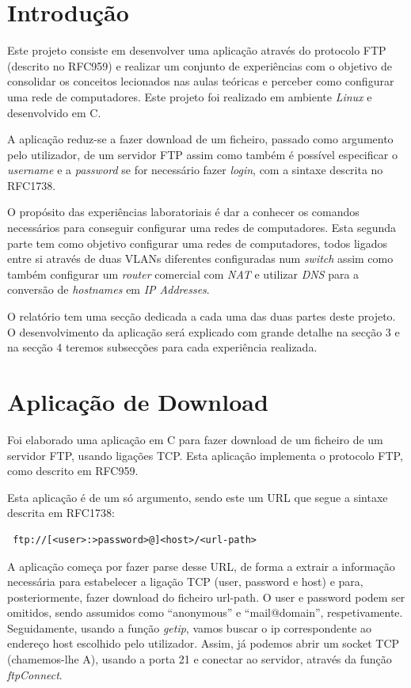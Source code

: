\documentclass[a4paper]{article}
\begin{document}
\section{Introdução}

Este projeto consiste em desenvolver uma aplicação através do protocolo FTP (descrito no RFC959) e realizar um conjunto de experiências com o objetivo de consolidar os conceitos lecionados nas aulas teóricas e perceber como configurar uma rede de computadores. Este projeto foi realizado em ambiente \textit{Linux} e desenvolvido em C.

A aplicação reduz-se a fazer download de um ficheiro, passado como argumento pelo utilizador, de um servidor FTP assim como também é possível especificar o \textit{username} e a \textit{password} se for necessário fazer \textit{login}, com a sintaxe descrita no RFC1738.

O propósito das experiências laboratoriais é dar a conhecer os comandos necessários para conseguir configurar uma redes de computadores. Esta segunda parte tem como objetivo configurar uma redes de computadores, todos ligados entre si através de duas VLANs diferentes configuradas num \textit{switch} assim como também configurar um \textit{router} comercial com \textit{NAT} e utilizar \textit{DNS} para a conversão de \textit{hostnames} em \textit{IP Addresses}.

O relatório tem uma secção dedicada a cada uma das duas partes deste projeto. O desenvolvimento da aplicação será explicado com grande detalhe na secção 3 e na secção 4 teremos subsecções para cada experiência realizada.

\section{Aplicação de Download}
Foi elaborado uma aplicação em C para fazer download de um ficheiro de um servidor FTP, usando ligações TCP. Esta aplicação implementa o protocolo FTP, como descrito em RFC959.

Esta aplicação é de um só argumento, sendo este um URL que segue a sintaxe descrita em RFC1738: \begin{verbatim} ftp://[<user>:>password>@]<host>/<url-path> \end{verbatim}
A aplicação começa por fazer parse desse URL, de forma a extrair a informação necessária para estabelecer a ligação TCP (user, password e host) e para, posteriormente, fazer download do ficheiro url-path. O user e password podem ser omitidos, sendo assumidos como “anonymous” e “mail@domain”, respetivamente.
Seguidamente, usando a função \textit{getip}, vamos buscar o ip correspondente ao endereço host escolhido pelo utilizador. Assim, já podemos abrir um socket TCP (chamemos-lhe A), usando a porta 21 e conectar ao servidor, através da função \textit{ftpConnect}. 
 
\end{document}
